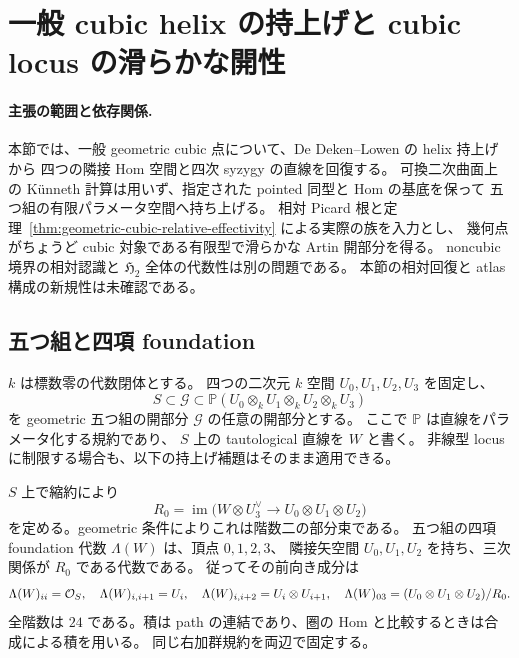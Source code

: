 \section{一般 cubic helix の持上げと cubic locus の滑らかな開性}
\label{sec:cubic-smooth-atlas}

\paragraph{主張の範囲と依存関係.}
本節では、一般 geometric cubic 点について、De Deken--Lowen の helix 持上げから
四つの隣接 Hom 空間と四次 syzygy の直線を回復する。
可換二次曲面上の Künneth 計算は用いず、指定された pointed 同型と Hom の基底を保って
五つ組の有限パラメータ空間へ持ち上げる。
相対 Picard 根と定理~\ref{thm:geometric-cubic-relative-effectivity} による実際の族を入力とし、
幾何点がちょうど cubic 対象である有限型で滑らかな Artin 開部分を得る。
noncubic 境界の相対認識と $\mathfrak H_2$ 全体の代数性は別の問題である。
本節の相対回復と atlas 構成の新規性は未確認である。

\subsection{五つ組と四項 foundation}

$k$ は標数零の代数閉体とする。
四つの二次元 $k$ 空間 $U_0,U_1,U_2,U_3$ を固定し、
\[
 S\subset\mathscr G\subset
 \mathbb P(U_0\otimes_kU_1\otimes_kU_2\otimes_kU_3)
\]
を geometric 五つ組の開部分 $\mathscr G$ の任意の開部分とする。
ここで $\mathbb P$ は直線をパラメータ化する規約であり、
$S$ 上の tautological 直線を $W$ と書く。
非線型 locus に制限する場合も、以下の持上げ補題はそのまま適用できる。

$S$ 上で縮約により
\[
 R_0=\operatorname{im}
 \bigl(W\otimes U_3^\vee\longrightarrow U_0\otimes U_1\otimes U_2\bigr)
\]
を定める。geometric 条件によりこれは階数二の部分束である。
五つ組の四項 foundation 代数 $\Lambda(W)$ は、頂点 $0,1,2,3$、
隣接矢空間 $U_0,U_1,U_2$ を持ち、三次関係が $R_0$ である代数である。
従ってその前向き成分は
\[
 \Lambda(W)_{ii}=\mathcal O_S,\quad
 \Lambda(W)_{i,i+1}=U_i,\quad
 \Lambda(W)_{i,i+2}=U_i\otimes U_{i+1},\quad
 \Lambda(W)_{03}=(U_0\otimes U_1\otimes U_2)/R_0.
\]
全階数は $24$ である。積は path の連結であり、圏の Hom と比較するときは合成による積を用いる。
同じ右加群規約を両辺で固定する。

